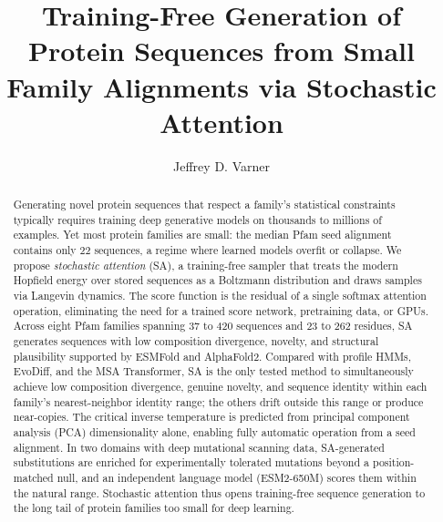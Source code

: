 \documentclass[11pt,onecolumn,twoside,lineno]{pnas-new}
\title{Training-Free Generation of Protein Sequences from Small Family Alignments via Stochastic Attention}
\author[a,1]{Jeffrey D. Varner}
\affil[a]{R.F. Smith School of Chemical and Biomolecular Engineering, Cornell University, Ithaca, NY 14850}
\begin{document}
\begin{abstract}
Generating novel protein sequences that respect a family's statistical constraints typically requires training deep generative models on thousands to millions of examples. Yet most protein families are small: the median Pfam seed alignment contains only 22 sequences, a regime where learned models overfit or collapse. We propose \emph{stochastic attention} (SA), a training-free sampler that treats the modern Hopfield energy over stored sequences as a Boltzmann distribution and draws samples via Langevin dynamics. The score function is the residual of a single softmax attention operation, eliminating the need for a trained score network, pretraining data, or GPUs. Across eight Pfam families spanning 37 to 420 sequences and 23 to 262 residues, SA generates sequences with low composition divergence, novelty, and structural plausibility supported by ESMFold and AlphaFold2. Compared with profile HMMs, EvoDiff, and the MSA Transformer, SA is the only tested method to simultaneously achieve low composition divergence, genuine novelty, and sequence identity within each family's nearest-neighbor identity range; the others drift outside this range or produce near-copies. The critical inverse temperature is predicted from principal component analysis (PCA) dimensionality alone, enabling fully automatic operation from a seed alignment. In two domains with deep mutational scanning data, SA-generated substitutions are enriched for experimentally tolerated mutations beyond a position-matched null, and an independent language model (ESM2-650M) scores them within the natural range. Stochastic attention thus opens training-free sequence generation to the long tail of protein families too small for deep learning.
\end{abstract}

\maketitle
\thispagestyle{firststyle}
\end{document}

